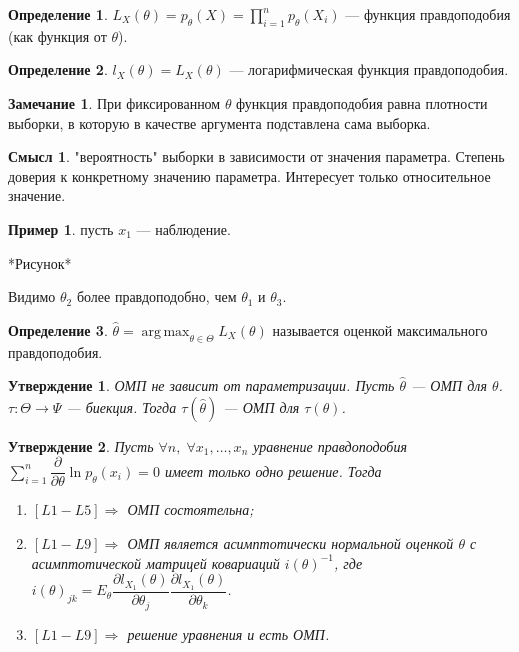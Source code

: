 \documentclass[12pt]{report}
\DeclareMathOperator*{\argmax}{arg\,max}
\newtheorem{proposition}{Утверждение}
\theoremstyle{definition}
\newtheorem{definition}{Определение}
\newtheorem{example}{Пример}
\newtheorem{sense}{Смысл}
\newtheorem{remark}{Замечание}
\begin{document}
\begin{definition}
	$L_X(\theta) = p_\theta(X) = \displaystyle{\prod_{i = 1}^n}p_\theta(X_i)$ — функция правдоподобия (как функция от $\theta$).
\end{definition}
\begin{definition}
	$l_X(\theta) = L_X(\theta)$ — логарифмическая функция правдоподобия.
\end{definition}
\begin{remark}
	При фиксированном $\theta$ функция правдоподобия равна плотности выборки, в которую в качестве аргумента подставлена сама выборка.
\end{remark}
\begin{sense}
	"вероятность" выборки в зависимости от значения параметра. Степень доверия к конкретному значению параметра. Интересует только относительное значение.
\end{sense}
\begin{example}
	пусть $x_1$ — наблюдение.

	*Рисунок*

	Видимо $\theta_2$ более правдоподобно, чем $\theta_1$ и $\theta_3$.
\end{example}
\begin{definition}
	$\hat{\theta} = \argmax_{\theta \in \Theta} L_X(\theta)$ называется оценкой максимального правдоподобия.
\end{definition}
\begin{proposition}
	ОМП не зависит от параметризации. Пусть $\hat{\theta}$ — ОМП для $\theta$. $\tau : \Theta \rightarrow \Psi$ — биекция. Тогда $\tau(\hat{\theta})$ — ОМП для $\tau(\theta)$.
\end{proposition}
\begin{proposition}
	Пусть $\forall n,\;\forall x_1, \ldots,x_n$ уравнение правдоподобия $\displaystyle{\sum_{i=1}^n}\dfrac{\partial}{\partial \theta}\ln p_\theta(x_i) = 0$ имеет только одно решение. Тогда
	\begin{enumerate}
		\item $[L1-L5]\Rightarrow$ ОМП состоятельна;
		\item $[L1-L9]\Rightarrow$ ОМП является асимптотически нормальной оценкой $\theta$ с асимптотической матрицей ковариаций $i(\theta)^{-1}$, где $i(\theta)_{jk} = E_\theta \dfrac{\partial l_{X_1}(\theta)}{\partial \theta_j}\dfrac{\partial l_{X_1}(\theta)}{\partial \theta_k}$.
		\item $[L1-L9]\Rightarrow$ решение уравнения и есть ОМП.
	\end{enumerate}
\end{proposition}
\end{document}
